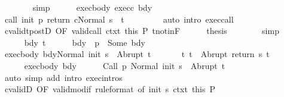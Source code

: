 \begin{isabellebody}
\ \ \ \ \ \ \isamarkupfalse%
\ simp\isanewline
\ \ \ \ \isamarkupfalse%
\ exec{\isacharunderscore}body\ exec{\isacharunderscore}c\ bdy\ \isanewline
\ \ \ \ \isamarkupfalse%
\ {\isachardoublequoteopen}{\isasymGamma}{\isasymturnstile}{\isasymlangle}call\ init\ p\ return{\isacharprime}\ c{\isacharcomma}Normal\ s{\isasymrangle}\ {\isasymRightarrow}\ t{\isachardoublequoteclose}\ \isanewline
\ \ \ \ \ \ \isamarkupfalse%
\ {\isacharparenleft}auto\ intro{\isacharcolon}\ exec{\isacharunderscore}call{\isacharparenright}\isanewline
\ \ \ \ \isamarkupfalse%
\ cvalidt{\isacharunderscore}postD\ {\isacharbrackleft}OF\ valid{\isacharunderscore}call\ ctxt\ this{\isacharbrackright}\ P\ t{\isacharunderscore}notin{\isacharunderscore}F\isanewline
\ \ \ \ \isamarkupfalse%
\ {\isacharquery}thesis\isanewline
\ \ \ \ \ \ \isamarkupfalse%
\ simp\isanewline
\ \ \isamarkupfalse%
\isanewline
\ \ \ \ \isamarkupfalse%
\ bdy\ t{\isacharprime}\isanewline
\ \ \ \ \isamarkupfalse%
\ bdy{\isacharcolon}\ {\isachardoublequoteopen}{\isasymGamma}\ p\ {\isacharequal}\ Some\ bdy{\isachardoublequoteclose}\isanewline
\ \ \ \ \isamarkupfalse%
\ exec{\isacharunderscore}body{\isacharcolon}\ {\isachardoublequoteopen}{\isasymGamma}{\isasymturnstile}{\isasymlangle}bdy{\isacharcomma}Normal\ {\isacharparenleft}init\ s{\isacharparenright}{\isasymrangle}\ {\isasymRightarrow}\ Abrupt\ t{\isacharprime}{\isachardoublequoteclose}\ \isanewline
\ \ \ \ \isamarkupfalse%
\ t{\isacharcolon}\ {\isachardoublequoteopen}t\ {\isacharequal}\ Abrupt\ {\isacharparenleft}return\ s\ t{\isacharprime}{\isacharparenright}{\isachardoublequoteclose}\isanewline
\ \ \ \ \isamarkupfalse%
\ \isanewline
\ \ \ \ \isamarkupfalse%
\ exec{\isacharunderscore}body\ bdy\isanewline
\ \ \ \ \isamarkupfalse%
\ {\isachardoublequoteopen}{\isasymGamma}{\isasymturnstile}{\isasymlangle}Call\ p\ {\isacharcomma}Normal\ {\isacharparenleft}init\ s{\isacharparenright}{\isasymrangle}\ {\isasymRightarrow}\ Abrupt\ t{\isacharprime}{\isachardoublequoteclose}\isanewline
\ \ \ \ \ \ \isamarkupfalse%
\ {\isacharparenleft}auto\ simp\ add{\isacharcolon}\ intro{\isacharcolon}\ exec{\isachardot}intros{\isacharparenright}\isanewline
\ \ \ \ \isamarkupfalse%
\ cvalidD\ {\isacharbrackleft}OF\ valid{\isacharunderscore}modif\ {\isacharbrackleft}rule{\isacharunderscore}format{\isacharcomma}\ of\ {\isachardoublequoteopen}init\ s{\isachardoublequoteclose}{\isacharbrackright}\ ctxt{\isacharprime}\ this{\isacharbrackright}\ P\isanewline

\end{isabellebody}
